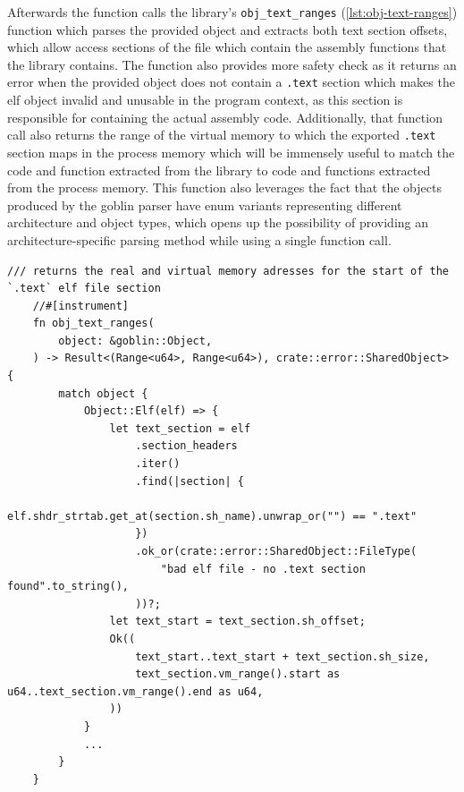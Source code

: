 Afterwards the function calls the library's \verb|obj_text_ranges| (\autoref{lst:obj-text-ranges}) function which parses the provided object and extracts both text section offsets, which allow access sections of the file which contain the assembly functions that the library contains.
The function also provides more safety check as it returns an error when the provided object does not contain a \verb|.text| section which makes the elf object invalid and unusable in the program context, as this section is responsible for containing the actual assembly code.
Additionally, that function call also returns the range of the virtual memory to which the exported \verb|.text| section maps in the process memory which will be immensely useful to match the code and function extracted from the library to code and functions extracted from the process memory.
This function also leverages the fact that the objects produced by the goblin parser have enum variants representing different architecture and object types, which opens up the possibility of providing an architecture-specific parsing method while using a single function call.

\begin{lstlisting}[caption=\label{lst:obj-text-ranges}"The function returning object text and virtual memory ranges"]
    /// returns the real and virtual memory adresses for the start of the `.text` elf file section
    //#[instrument]
    fn obj_text_ranges(
        object: &goblin::Object,
    ) -> Result<(Range<u64>, Range<u64>), crate::error::SharedObject> {
        match object {
            Object::Elf(elf) => {
                let text_section = elf
                    .section_headers
                    .iter()
                    .find(|section| {
                        elf.shdr_strtab.get_at(section.sh_name).unwrap_or("") == ".text"
                    })
                    .ok_or(crate::error::SharedObject::FileType(
                        "bad elf file - no .text section found".to_string(),
                    ))?;
                let text_start = text_section.sh_offset;
                Ok((
                    text_start..text_start + text_section.sh_size,
                    text_section.vm_range().start as u64..text_section.vm_range().end as u64,
                ))
            }
            ...
        }
    }
\end{lstlisting}

